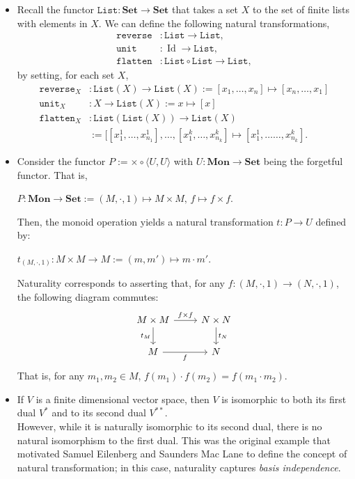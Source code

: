\documentclass[]{amsbook}
\newcommand{\catname}[1]{\mathbf{#1}}
\newcommand{\0}{\mathbf{0}}
\newcommand{\1}{\mathbf{1}}
\newcommand{\List}{\texttt{List}}
\newcommand{\opn}[1]{\operatorname{#1}}
\begin{document}
\begin{itemize}
    \item Recall the functor $\List: \catname{Set} \to \catname{Set}$ that
    takes a set $X$ to the set of finite lists with elements in $X$. We can
    define the following natural transformations,
    \begin{align*}
        \texttt{reverse} &: \List \to \List,\\
        \texttt{unit} &: \opn{Id} \to \List,\\
        \texttt{flatten} &: \List \circ \List \to \List,
    \end{align*}
    by setting, for each set $X$,
    \begin{align*}
        \texttt{reverse}_X &: \List(X) \to \List(X) :=
        [x_1, \ldots, x_n] \mapsto [x_n, \ldots, x_1]\\
        \texttt{unit}_X &: X \to \List(X) := x \mapsto [x]\\
        \texttt{flatten}_X &: \List(\List(X)) \to \List(X)\\
        &:= [[x_1^1, \ldots, x_{n_1}^1], \ldots, [x_1^k, \ldots, x_{n_k}^k]
        \mapsto [x_1^1, \ldots \ldots, x_{n_k}^k].
    \end{align*}

    \item Consider the functor $P := \times \circ \langle U, U \rangle$ with
    $U: \catname{Mon} \to \catname{Set}$ being the forgetful functor. That is,
    \begin{center}
        $P: \catname{Mon} \to \catname{Set} := (M, \cdot, 1) \mapsto M \times M,
        \, f \mapsto f \times f$.
    \end{center}
    Then, the monoid operation yields a natural transformation $t: P \to U$
    defined by:
    \begin{center}
        $t_{(M, \cdot, 1)}: M \times M \to M := (m, m') \mapsto m \cdot m'$.
    \end{center}
    Naturality corresponds to asserting that, for any $f: (M, \cdot, 1) \to
    (N, \cdot, 1)$, the following diagram commutes:
    \[
    \begin{tikzcd}
        M \times M \arrow[r, "f \times f"]
                   \arrow[d, swap, "t_M"]
                   & N \times N \arrow[d, "t_N"] \\
        M \arrow[r, swap, "f"]
          & N
    \end{tikzcd}
    \]
    That is, for any $m_1, m_2 \in M$, $f(m_1) \cdot f(m_2) = f(m_1 \cdot m_2)$.

    \item If $V$ is a finite dimensional vector space, then $V$ is isomorphic
    to both its first dual $V^*$ and to its second dual $V^{**}$.\\
    However, while it is naturally isomorphic to its second dual, there is no
    natural isomorphism to the first dual. This was the original example that
    motivated Samuel Eilenberg and Saunders Mac Lane to define the concept of
    natural transformation; in this case, naturality captures \emph{basis
    independence}.
\end{itemize}
\end{document}
